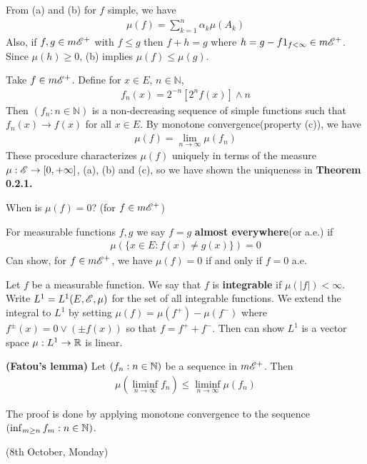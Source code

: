 \documentclass[12pt,a4paper]{report}
\begin{document}
From (a) and (b) for $f$ simple, we have
\begin{align*}
\mu(f) = \sum_{k=1}^n \alpha_k \mu(A_k)
\end{align*}
Also, if $f,g \in m\mathscr{E}^+$ with $f\leq g$ then $f+h = g$ where $h = g- f1_{f<\infty} \in m\mathscr{E}^+$.  Since $\mu(h) \geq 0$, (b) implies $\mu(f) \leq \mu(g)$.
\s

Take $f\in m\mathscr{E}^+$. Define for $x\in E$, $n \in \mathbb{N}$,
\begin{align*}
f_n(x) = 2^{-n}[2^n f(x)] \wedge n 
\end{align*}
Then $(f_n:n\in \mathbb{N})$ is a non-decreasing sequence of simple functions such that $f_n(x) \rightarrow f(x)$ for all $x\in E$. By monotone convergence(property (c)), we have
\begin{align*}
\mu(f) = \lim_{n\rightarrow \infty} \mu(f_n)
\end{align*}
These procedure characterizes $\mu(f)$ uniquely in terms of the measure $\mu : \mathscr{E} \rightarrow [0,+\infty]$, (a), (b) and (c), so we have shown the uniqueness in \textbf{Theorem 0.2.1.}
\s

When is $\mu(f)=0$? (for $f\in m\mathscr{E}^+$)
\s

For measurable functions $f,g$ we say $f=g$ \textbf{almost everywhere}(or a.e.) if
\begin{align*}
\mu(\{x\in E : f(x) \neq g(x) \}) =0
\end{align*}
Can show, for $f\in m\mathscr{E}^+$, we have $\mu(f) =0$ if and only if $f=0$ a.e.
\s

Let $f$ be a measurable function. We say that $f$ is \textbf{integrable} if $\mu(|f|) <\infty$. Write $L^1 = L^1(E,\mathscr{E},\mu)$ for the set of all integrable functions. We extend the integral to $L^1$ by setting $\mu(f)= \mu(f^+) - \mu(f^-)$ where $f^{\pm}(x) = 0 \vee (\pm f(x))$ so that $f = f^+ + f^-$. Then can show $L^1$ is a vector space $\mu: L^1 \rightarrow \mathbb{R}$ is linear. 
\s

 \textbf{(Fatou's lemma)} Let $(f_n:n\in \mathbb{N})$ be a sequence in $m\mathscr{E}^+$. Then
\begin{align*}
\mu(\liminf_{n\rightarrow \infty} f_n) \leq \liminf_{n\rightarrow \infty} \mu(f_n)
\end{align*}
\eos

The proof is done by applying monotone convergence to the sequence $(\inf_{m\geq n} f_m : n \in \mathbb{N})$.
\s

\newday

(8th October, Monday)
\s
\end{document}
